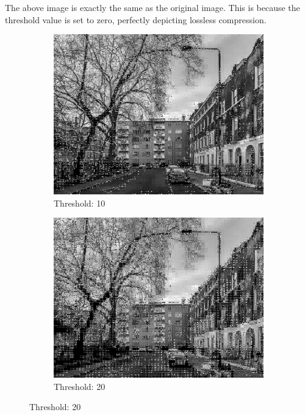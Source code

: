 \documentclass{article}
\begin{document}
The above image is exactly the same as the original image. This is because the threshold value is set to zero, perfectly depicting lossless compression.

\begin{figure}[htbp]
    \centering
    \begin{subfigure}{0.3\textwidth}
        \centering
        \includegraphics[width=\linewidth]{RECONSTRUCTED10.jpeg}
        \caption{Threshold: 10}
    \end{subfigure}\hfill
    \begin{subfigure}{0.3\textwidth}
        \centering
        \includegraphics[width=\linewidth]{RECONSTRUCTED20.jpeg}
        \caption{Threshold: 20}

\end{subfigure}
\end{figure}
\end{document}

